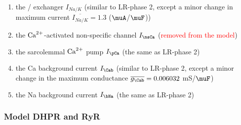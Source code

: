 \begin{enumerate}
\item the / exchanger $I_{Na/K}$ (similar to LR-phase
  2, except a minor change in maximum current $\overline{I_{Na/K}} =
  1.3$ ($\muA$/$\muF$))

\item the ${\text{Ca}^{2+}}$-activated non-specific channel $I_\nsCa$
  (\textcolor{red}{removed from the model})

\item the sarcolemmal ${\text{Ca}^{2+}}$ pump $I_\pCa$ (the same as
  LR-phase 2)

\item the Ca background current $I_\Cab$ (similar to LR-phase 2,
  except a minor change in the maximum conductance
  $\overline{g_\Cab} = 0.006032$ mS/$\muF$)

\item the Na background current $I_\bNa$ (the same as LR-phase 2)
\end{enumerate}


\subsubsection{Model DHPR and RyR}
\label{sec:model-dhpr-ryr}


